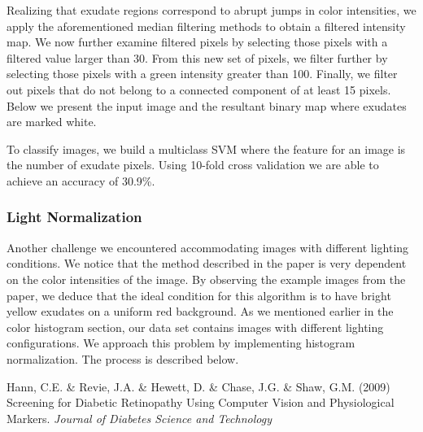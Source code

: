 \documentclass{article} %
\begin{document}
Realizing that exudate regions correspond to abrupt jumps in color intensities, we apply the aforementioned median filtering methods to obtain a filtered intensity map. We now further examine filtered pixels by selecting those pixels with a filtered value larger than 30. From this new set of pixels, we filter further by selecting those pixels with a green intensity greater than 100. Finally, we filter out pixels that do not belong to a connected component of at least 15 pixels. Below we present the input image and the resultant binary map where exudates are marked white.

\begin{figure}[htp]
  \centering
  \quad
\end{figure}

To classify images, we build a multiclass SVM where the feature for an image is the number of exudate pixels. Using 10-fold cross validation we are able to achieve an accuracy of 30.9\%.

\subsubsection{Light Normalization}
Another challenge we encountered accommodating images with different lighting conditions. We notice that the method described in the paper is very dependent on the color intensities of the image. By observing the example images from the paper, we deduce that the ideal condition for this algorithm is to have bright yellow exudates on a uniform red background. As we mentioned earlier in the color histogram section, our data set contains images with different lighting configurations. We approach this problem by implementing histogram normalization. The process is described below.


\begin{thebibliography}{9}
Hann, C.E. \& Revie, J.A. \& Hewett, D. \& Chase, J.G. \& Shaw, G.M.
(2009) Screening for Diabetic Retinopathy Using Computer Vision and Physiological Markers. 
{\it Journal of Diabetes Science and Technology}
\end{thebibliography}
\end{document}
